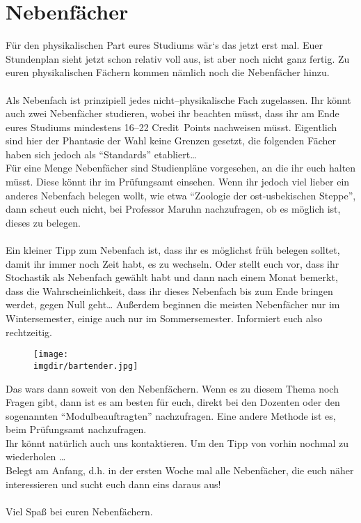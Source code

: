 \section{Nebenfächer}
\label{sec:Nebenfach}
Für den physikalischen Part eures Studiums wär`s das jetzt erst mal.
Euer Stundenplan sieht jetzt schon relativ voll aus, ist aber noch nicht ganz fertig.
Zu euren physikalischen Fächern kommen nämlich noch die Nebenfächer hinzu.\\
\\
Als Nebenfach ist prinzipiell jedes nicht--physikalische Fach zugelassen.
Ihr könnt auch zwei Nebenfächer studieren, wobei ihr beachten müsst, dass ihr am Ende eures Studiums mindestens 16--22 Credit~Points nachweisen müsst.
Eigentlich sind hier der Phantasie der Wahl keine Grenzen gesetzt, die folgenden Fächer haben sich
jedoch als "`Standards"' etabliert\ldots{}\\
Für eine Menge Nebenfächer sind Studienpläne vorgesehen, an die ihr euch halten müsst.
Diese könnt ihr im Prüfungsamt einsehen.
Wenn ihr jedoch viel lieber ein anderes Nebenfach belegen wollt,
wie etwa "`Zoologie der ost-usbekischen Steppe"', dann scheut euch nicht,
bei Professor Maruhn nachzufragen, ob es möglich ist, dieses zu belegen.\\
\\
Ein kleiner Tipp zum Nebenfach ist, dass ihr es möglichst früh
belegen solltet, damit ihr immer noch Zeit habt, es zu wechseln.
Oder stellt euch vor, dass ihr Stochastik als Nebenfach gewählt
habt und dann nach einem Monat bemerkt, dass die
Wahrscheinlichkeit, dass ihr dieses Nebenfach bis zum Ende bringen
werdet, gegen Null geht\ldots{}
Außerdem beginnen die meisten Nebenfächer nur im Wintersemester, einige auch nur im Sommersemester.
Informiert euch also rechtzeitig.



\begin{figure}
	\centering
	\texttt{[image: \\imgdir/bartender.jpg]}
\end{figure}
\newpage
%

%

%

%

%

%

%

%

%

%

%
\bigskip

Das wars dann soweit von den Nebenfächern.
Wenn es zu diesem Thema noch Fragen gibt, dann ist es am besten für euch, direkt bei den Dozenten oder den sogenannten "`Modulbeauftragten"' nachzufragen.
Eine andere Methode ist es, beim Prüfungsamt nachzufragen.\\
Ihr könnt natürlich auch uns kontaktieren.
Um den Tipp von vorhin nochmal zu wiederholen \ldots\\
Belegt am Anfang, d.h. in der ersten Woche mal alle Nebenfächer, die euch näher interessieren und sucht euch dann eins daraus aus!\\
\\
Viel Spaß bei euren Nebenfächern.